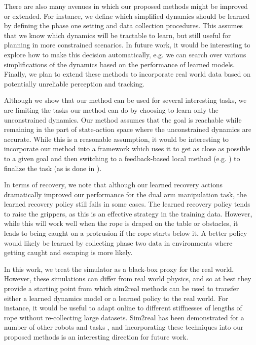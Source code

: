 There are also many avenues in which our proposed methods might be improved or extended. For instance, we define which simplified dynamics should be learned by defining the phase one setting and data collection procedures. This assumes that we know which dynamics will be tractable to learn, but still useful for planning in more constrained scenarios. In future work, it would be interesting to explore how to make this decision automatically, e.g. we can search over various simplifications of the dynamics based on the performance of learned models. Finally, we plan to extend these methods to incorporate real world data based on potentially unreliable perception and tracking.

Although we show that our method can be used for several interesting tasks, we are limiting the tasks our method can do by choosing to learn only the unconstrained dynamics. Our method assumes that the goal is reachable while remaining in the part of state-action space where the unconstrained dynamics are accurate. While this is a reasonable assumption, it would be interesting to incorporate our method into a framework which uses it to get as close as possible to a given goal and then switching to a feedback-based local method (e.g. \cite{LinearAlarcon2013,Jia2018,Wu2020}) to finalize the task (as is done in \cite{McConachie2020}).

In terms of recovery, we note that although our learned recovery actions dramatically improved our performance for the dual arm manipulation task, the learned recovery policy still fails in some cases. The learned recovery policy tends to raise the grippers, as this is an effective strategy in the training data. However, while this will work well when the rope is draped on the table or obstacles, it leads to being caught on a protrusion if the rope starts below it. A better policy would likely be learned by collecting phase two data in environments where getting caught and escaping is more likely. 

In this work, we treat the simulator as a black-box proxy for the real world. However, these simulations can differ from real world physics, and so at best they provide a starting point from which sim2real methods can be used to transfer either a learned dynamics model \cite{Fu2016,Clavera2018} or a learned policy \cite{Bousmalis2018,Peng2018} to the real world. For instance, it would be useful to adapt online to different stiffnesses of lengths of rope without re-collecting large datasets. Sim2real has been demonstrated for a number of other robots and tasks \cite{Lee2020,OpenAI2019}, and incorporating these techniques into our proposed methods is an interesting direction for future work.